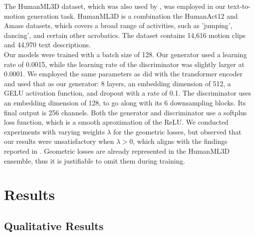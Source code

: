 \documentclass[10pt,twocolumn,letterpaper]{article}
\begin{document}
The HumanML3D dataset, which was also used by \cite{Tevet23}, was employed in our text-to-motion generation task. HumanML3D \cite{Guo_2022_CVPR}
is a combination the HumanAct12 \cite{guo2020action2motion} and Amass \cite{Amass} datasets, which covers a broad range of activities, such as 'jumping', 
dancing', and certain other acrobatics. The dataset contains 14,616 motion clips and 44,970 text descriptions.
\\

Our models were trained with a batch size of 128. Our generator used a learning rate of 0.0015, while the learning rate of the discriminator was slightly 
larger at 0.0001. We employed the same parameters as \cite{Tevet23} did with the transformer encoder and used that as our generator: 8 layers, an embedding 
dimension of 512, a GELU activation function, and dropout with a rate of 0.1. The discriminator uses an embedding dimension of 128, to go along with its 6 
downsampling blocks. Its final output is 256 channels. Both the generator and discriminator use a softplus loss function, which is a smooth aproximation 
of the ReLU. We conducted experiments with varying weights $\lambda$ for the geometric losses, but observed that our results were unsatisfactory when 
$\lambda > 0$, which aligns with the findings reported in \cite{Tevet23}. Geometric losses are already represented in the HumanML3D ensemble, thus it is
justifiable to omit them during training.
\section{Results}
\label{sec:results}
\subsection{Qualitative Results}
\end{document}
